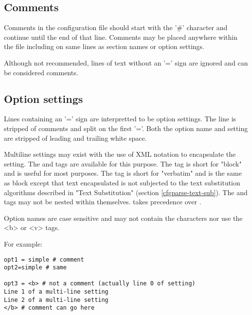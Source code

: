 \documentclass{howto}
\begin{document}
\subsection{Comments}

Comments in the configuration file should start with the '\#' character and
continue until the end of that line.  Comments may be placed anywhere
within the file including on same lines as section names or option settings.

Although not recommended, lines of text without an '=' sign are ignored and
can be considered comments.

\subsection{Option settings}

Lines containing an '=' sign are interpretted to be option settings.  The
line is stripped of comments and split on the first '='.  Both the option
name and setting are stripped of leading and trailing white space.

Multiline settings may exist with the use of XML notation to encapsulate
the setting.  The  and  tags are available for this 
purpose.  The  tag is short for "block" and is useful for most
purposes.  The  tag is short for "verbatim" and is the same
as block except that text encapsulated is not subjected to the 
text substitution algorithms described in "Text Substitution" 
(section \ref{cfgparse-text-sub}).  The  and  tags
may not be nested within themselves.   takes precedence over
.

Option names are case sensitive and may not contain the \code{[ ] =} 
characters nor use the <b> or <v> tags.

For example:

\begin{verbatim}
opt1 = simple # comment
opt2=simple # same 

opt3 = <b> # not a comment (actually line 0 of setting)
Line 1 of a multi-line setting
Line 2 of a multi-line setting
</b> # comment can go here
\end{verbatim}

\end{document}
